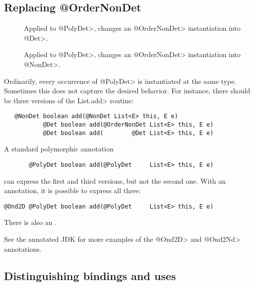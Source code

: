 \subsection{Replacing @OrderNonDet\label{determinism-polymorphism-ordernondet}}

\begin{description}
\item[]
  Applied to \<@PolyDet>,
  changes an \<@OrderNonDet> instantiation into \<@Det>.
\item[]
  Applied to \<@PolyDet>,
  changes an \<@OrderNonDet> instantiation into \<@NonDet>.
\end{description}

Ordinarily, every occurrence of \<@PolyDet> is instantiated at the same
type.  Sometimes this does not capture the desired behavior.  For instance,
there should be three versions of the \<List.add> routine:

\begin{Verbatim}
   @NonDet boolean add(@NonDet List<E> this, E e)
           @Det boolean add(@OrderNonDet List<E> this, E e)
           @Det boolean add(        @Det List<E> this, E e)
\end{Verbatim}

A standard polymorphic annotation

\begin{Verbatim}
       @PolyDet boolean add(@PolyDet     List<E> this, E e)
\end{Verbatim}

\noindent
can express the first and third versions, but not the second one.  With an
 annotation, it is
possible to express all three:

\begin{Verbatim}
@Ond2D @PolyDet boolean add(@PolyDet     List<E> this, E e)
\end{Verbatim}

There is also an .

See the annotated JDK for more examples of the \<@Ond2D> and \<@Ond2Nd>
annotations.


\subsection{Distinguishing bindings and uses\label{determinism-polymorphism-binding}}

